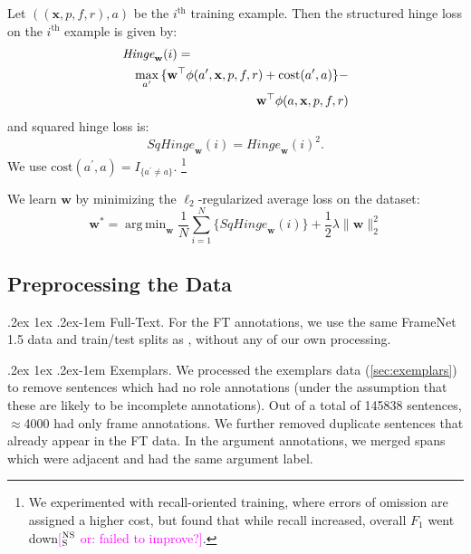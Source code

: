 \documentclass[11pt,a4paper]{article}
\makeatletter
\newcommand{\indicator}[1]{I_{\{#1\}}} %
\DeclareMathOperator*{\argmin}{arg\,min}
\newcommand{\ensuretext}[1]{#1}
\newcommand{\nssmarker}{\ensuretext{\textcolor{magenta}{\ensuremath{^{\textsc{NS}}_{\textsc{S}}}}}}
\newcommand{\arkcomment}[3]{\ensuretext{\textcolor{#3}{[#1 #2]}}}
\newcommand{\nss}[1]{\arkcomment{\nssmarker}{#1}{magenta}}
\renewcommand{\paragraph}{%
  \@startsection{paragraph}{4}%
  {\z@}{.2ex \@plus 1ex \@minus .2ex}{-1em}%
  {\normalfont\normalsize\bfseries}%
}
\makeatother
\begin{document}
Let $((\mathbf{x}, p, f, r), a)$ %
be the $i^{\text{th}}$ training example.
Then the structured hinge loss on the $i^{\text{th}}$ example is given by:
\begin{align*}
\lefteqn{\textit{Hinge}_\mathbf{w}(i) =} \\
&&\max_{a^\prime}{\{\mathbf{w}^\top \mathbf{\phi}(a^\prime, \mathbf{x}, p, f, r) + \text{cost}(a^\prime, a)\}} - \\
&&\mathbf{w}^\top \mathbf{\phi}(a, \mathbf{x}, p, f, r)
\end{align*}
and squared hinge loss is:
\begin{equation}
\textit{SqHinge}_\mathbf{w}(i) =
\textit{Hinge}_\mathbf{w}(i)^2.
\end{equation}
We use $\text{cost}(a^\prime, a) = \indicator{a^\prime \ne a}$.%
\footnote{We experimented with recall-oriented training, where errors of omission are assigned a higher cost, but found that while recall increased, overall $F_1$ went down\nss{or: failed to improve?}.}

We learn $\mathbf{w}$ by minimizing the $\ell_2$-regularized average loss on the dataset:
\begin{equation}
\mathbf{w^*} = \argmin_\mathbf{w}{
    \frac{1}{N}\sum_{i = 1}^N\{
        \textit{SqHinge}_\mathbf{w}(i)
    \} + \frac{1}{2} \lambda \| \mathbf{w} \|_2^2
}
\end{equation}





\subsection{Preprocessing the Data}

\paragraph{Full-Text.}
For the FT annotations, we use the same FrameNet 1.5 data and train/test splits as \citet{das-14}, without any of our own processing.

\paragraph{Exemplars.} 
We processed the exemplars data (\cref{sec:exemplars}) to remove sentences which had no role annotations (under the assumption that these are likely to be
incomplete annotations). Out of a total of 145838 sentences, $\approx$4000 had only frame annotations. 
We further removed duplicate sentences that already appear in the FT data. 
In the argument annotations, we merged spans which were adjacent and had the same argument label.
\end{document}
